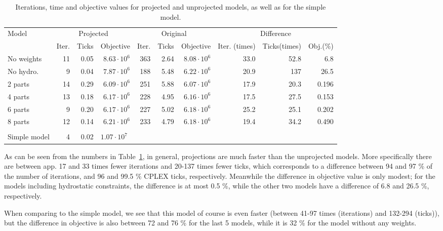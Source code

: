 \begin{table}[htbp]
\centering
\begin{tabular}{l|rrr|rrr|rrr}
\toprule
Model&\multicolumn{3}{c|}{Projected}&\multicolumn{3}{c|}{Original}&\multicolumn{3}{c}{Difference}\\
&Iter.&Ticks&Objective&Iter.&Ticks&Objective&Iter. (times)&Ticks(times)&Obj.(\%)\\ 
\midrule
No weights&	11 & 0.05 & $8.63\cdot 10^6$ &	363 & 2.64&$8.08\cdot 10^6$
&33.0&52.8&6.8\\
\midrule
{No hydro.}& 9 & 0.04 &$7.87\cdot 10^6$&	188 & 5.48&$6.22 \cdot 10^6$
&20.9&137&26.5\\
\midrule
{2 parts}& 14 & 0.29 & $6.09\cdot 10^6$ &	251 & 5.88&$6.07\cdot 10^6$
&17.9&20.3&0.196\\
\midrule
{4 parts} &13 & 0.18 &$6.17\cdot 10^6$ & 228 & 4.95 &$6.16\cdot 10^6$
&17.5&27.5&0.153\\
\midrule
{6 parts} &9 & 0.20& $6.17\cdot 10^6$ &227 & 5.02 &$6.18\cdot 10^6$
&25.2&25.1&0.202\\
\midrule
{8 parts} &12 & 0.14& $6.21\cdot 10^6$ & 233 & 4.79 &$6.18\cdot 10^6$
&19.4&34.2&0.490\\
\bottomrule
\multicolumn{10}{c}{}\\
\cmidrule{1-4}
Simple model & 4 & 0.02 &\multicolumn{2}{l}{$1.07\cdot 10^7$}\\
\cmidrule{1-4}
\end{tabular}
\caption{Iterations, time and objective values for projected and unprojected models, as well as for the simple model. }
\label{tab:usingProjections}
\end{table}
As can be seen from the numbers in Table~\ref{tab:usingProjections}, in general, projections are much faster than the unprojected models. More specifically there are between app. 17 and 33 times fewer iterations and 20-137 times fewer ticks, which corresponds to a difference between 94 and 97 \% of the number of iterations, and 96 and 99.5 \% CPLEX ticks, respectively. 
Meanwhile the difference in objective value is only modest; for the models including hydrostatic constraints, the difference is at most 0.5 \%, while the other two models have a difference of 6.8 and 26.5 \%, respectively. 

When comparing to the simple model, we see that this model of course is even faster (between 41-97 times (iterations) and 132-294 (ticks)), but the difference in objective is also between 72 and 76 \% for the last 5 models, while it is 32 \% for the model without any weights. 

